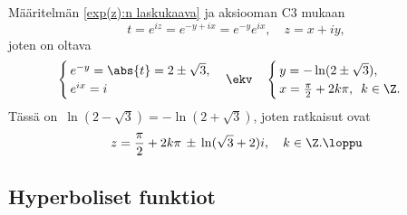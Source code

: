 Määritelmän \eqref{exp(z):n laskukaava} ja aksiooman C3 mukaan
\[
t=e^{iz} = e^{-y+ix} = e^{-y}e^{ix}, \quad z=x+iy,
\]
joten on oltava
\[
\begin{cases} \,e^{-y}=\abs{t}=2\pm\sqrt{3}, \\ \,e^{ix}=i  \end{cases} \ekv\quad
\begin{cases} \,y=-\ln(2\pm\sqrt{3}), \\ \,x=\frac{\pi}{2}+2k\pi,\,\ k\in\Z. \end{cases}
\]
Tässä on $\,\ln(2-\sqrt{3})=-\ln(2+\sqrt{3})$, joten ratkaisut ovat
\[ 
z= \frac{\pi}{2}+2k\pi\,\pm\,\ln(\sqrt{3}+2)i, \quad k\in\Z. \loppu
\]

\subsection{Hyperboliset funktiot}

